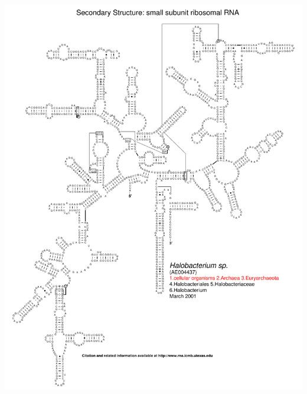 \documentclass[landscape]{slides}
\begin{document}
\begin{slide}\begin{center}\includegraphics[height=8in]{figs/arc-3}\end{center}\vfill\end{slide}
\end{document}
